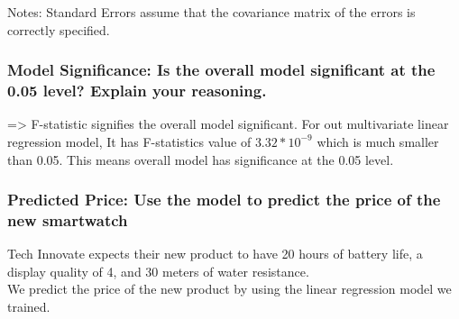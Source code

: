\documentclass[11pt]{article}
\begin{document}
Notes: \newline
 [1] Standard Errors assume that the covariance matrix of the errors is correctly specified.

    

    \hypertarget{model-significance-is-the-overall-model-significant-at-the-0.05-level-explain-your-reasoning.}{%
\subsubsection{Model Significance: Is the overall model significant at
the 0.05 level? Explain your
reasoning.}\label{model-significance-is-the-overall-model-significant-at-the-0.05-level-explain-your-reasoning.}}

=\textgreater{} F-statistic signifies the overall model significant. For
out multivariate linear regression model, It has F-statistics value of
\(3.32 * 10^{-9}\) which is much smaller than 0.05. This means overall
model has significance at the 0.05 level.

    \hypertarget{predicted-price-use-the-model-to-predict-the-price-of-the-new-smartwatch}{%
\subsubsection{Predicted Price: Use the model to predict the price of
the new
smartwatch}\label{predicted-price-use-the-model-to-predict-the-price-of-the-new-smartwatch}}

Tech Innovate expects their new product to have 20 hours of battery
life, a display quality of 4, and 30 meters of water resistance.\\
We predict the price of the new product by using the linear regression
model we trained.
\end{document}
